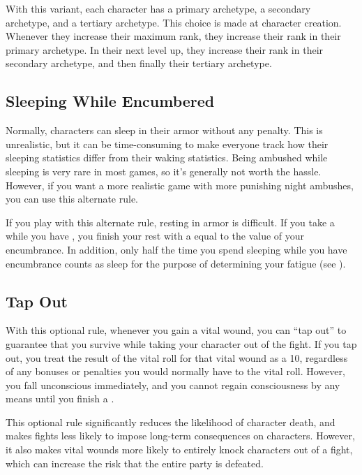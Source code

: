         With this variant, each character has a primary archetype, a secondary archetype, and a tertiary archetype.
        This choice is made at character creation.
        Whenever they increase their maximum rank, they increase their rank in their primary archetype.
        In their next level up, they increase their rank in their secondary archetype, and then finally their tertiary archetype.

    \subsection{Sleeping While Encumbered}
        Normally, characters can sleep in their armor without any penalty.
        This is unrealistic, but it can be time-consuming to make everyone track how their sleeping statistics differ from their waking statistics.
        Being ambushed while sleeping is very rare in most games, so it's generally not worth the hassle.
        However, if you want a more realistic game with more punishing night ambushes, you can use this alternate rule.

        If you play with this alternate rule, resting in armor is difficult.
        If you take a  while you have , you finish your rest with a  equal to the value of your encumbrance.
        In addition, only half the time you spend sleeping while you have encumbrance counts as sleep for the purpose of determining your fatigue (see ).

    \subsection{Tap Out}
        With this optional rule, whenever you gain a vital wound, you can ``tap out'' to guarantee that you survive while taking your character out of the fight.
        If you tap out, you treat the result of the vital roll for that vital wound as a 10, regardless of any bonuses or penalties you would normally have to the vital roll.
        However, you fall unconscious immediately, and you cannot regain consciousness by any means until you finish a .

        This optional rule significantly reduces the likelihood of character death, and makes fights less likely to impose long-term consequences on characters.
        However, it also makes vital wounds more likely to entirely knock characters out of a fight, which can increase the risk that the entire party is defeated.

